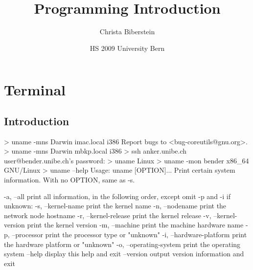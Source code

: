 \documentclass[10pt,a4paper]{scrartcl}
\date{HS 2009 University Bern}
\author{Christa Biberstein}
\title{Programming Introduction}
\begin{document}
\maketitle
\section{Terminal}
\subsection{Introduction}
\begin{terminalcode}
> uname -mns
  Darwin imac.local i386
  Report bugs to <bug-coreutils@gnu.org>.
> uname -mns
  Darwin mbkp.local i386
> ssh anker.unibe.ch
  user@bender.unibe.ch's password: 
> uname
  Linux
> uname -mon
  bender x86_64 GNU/Linux
> uname --help
  Usage: uname [OPTION]...
  Print certain system information.  With no OPTION, same as -s.
  
    -a, --all                print all information, in the following order,
                               except omit -p and -i if unknown:
    -s, --kernel-name        print the kernel name
    -n, --nodename           print the network node hostname
    -r, --kernel-release     print the kernel release
    -v, --kernel-version     print the kernel version
    -m, --machine            print the machine hardware name
    -p, --processor          print the processor type or "unknown"
    -i, --hardware-platform  print the hardware platform or "unknown"
    -o, --operating-system   print the operating system
        --help     display this help and exit
        --version  output version information and exit
\end{terminalcode}

\end{document}
